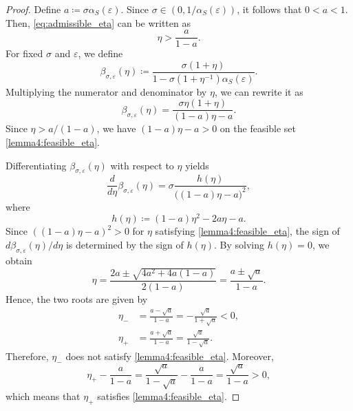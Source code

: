 \documentclass[letterpaper,10pt,conference]{ieeeconf}
\begin{document}
\begin{proof}
  Define $a \coloneqq \sigma \alpha_S(\varepsilon)$.
  Since $\sigma \in (0,1/\alpha_S(\varepsilon))$, it follows that $0 < a < 1$.
  Then, \eqref{eq:admissible_eta} can be written as
  \begin{equation} \label{lemma4:feasible_eta}
    \eta > \frac{a}{1-a}.
  \end{equation}
  For fixed $\sigma$ and $\varepsilon$, we define
  \begin{equation}
    \beta_{\sigma,\varepsilon}(\eta)
    \coloneqq \frac{\sigma(1+\eta)}{1-\sigma(1+\eta^{-1})\alpha_S(\varepsilon)}.
  \end{equation}
  Multiplying the numerator and denominator by $\eta$, we can rewrite it as
  \begin{equation}
    \beta_{\sigma,\varepsilon}(\eta)
    = \frac{\sigma \eta(1+\eta)}{(1-a)\eta-a}.
  \end{equation}
  Since $\eta > a/(1-a)$, we have $(1-a)\eta-a > 0$ on the feasible set \eqref{lemma4:feasible_eta}.

  Differentiating $\beta_{\sigma,\varepsilon}(\eta)$ with respect to $\eta$ yields
  \begin{equation}
    \frac{d}{d\eta}\beta_{\sigma,\varepsilon}(\eta)
    = \sigma \frac{h(\eta)}{\bigl((1-a)\eta-a\bigr)^2},
  \end{equation}
  where
  \begin{equation}
    h(\eta) \coloneqq (1-a)\eta^2 - 2a\eta - a.
  \end{equation}
  Since $((1-a)\eta-a)^2 > 0$ for $\eta$ satisfying \eqref{lemma4:feasible_eta}, the sign of $d\beta_{\sigma,\varepsilon}(\eta)/d\eta$ is determined by the sign of $h(\eta)$.
  By solving $h(\eta)=0$, we obtain
  \begin{equation}
    \eta
    = \frac{2a \pm \sqrt{4a^2 + 4a(1-a)}}{2(1-a)}
    = \frac{a \pm \sqrt{a}}{1-a}.
  \end{equation}
  Hence, the two roots are given by
  \begin{align}
    \eta_-
    &= \frac{a-\sqrt{a}}{1-a}
    = -\frac{\sqrt{a}}{1+\sqrt{a}}
    < 0, \\
    \eta_+
    &= \frac{a+\sqrt{a}}{1-a}
    = \frac{\sqrt{a}}{1-\sqrt{a}}.
  \end{align}
  Therefore, $\eta_-$ does not satisfy \eqref{lemma4:feasible_eta}.
  Moreover,
  \begin{equation}
    \eta_+ - \frac{a}{1-a}
    = \frac{\sqrt{a}}{1-\sqrt{a}} - \frac{a}{1-a}
    = \frac{\sqrt{a}}{1-a}
    > 0,
  \end{equation}
  which means that $\eta_+$ satisfies \eqref{lemma4:feasible_eta}.


\end{proof}
\end{document}
